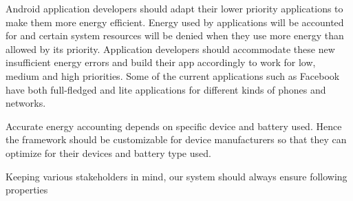 Android application developers should adapt their lower priority applications to make them more energy efficient. Energy used by applications will be accounted for and certain system resources will be denied when they use more energy than allowed by its priority. Application developers should accommodate these new insufficient energy errors and build their app accordingly to work for low, medium and high priorities. Some of the current applications such as Facebook have both full-fledged and lite applications for different kinds of phones and networks.

Accurate energy accounting depends on specific device and battery used. Hence the framework should be customizable for device manufacturers so that they can optimize for their devices and battery type used. 


Keeping various stakeholders in mind, our system should always ensure following properties

